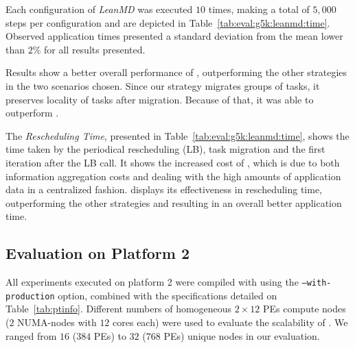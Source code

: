 


Each configuration of \textit{LeanMD} was executed $10$ times, making a total of $5,000$ steps per configuration and are depicted in Table~\ref{tab:eval:g5k:leanmd:time}.
Observed application times presented a standard deviation from the mean lower than $2\%$ for all results presented.

Results show a better overall performance of \packdrop, outperforming the other strategies in the two scenarios chosen.
Since our strategy migrates groups of tasks, it preserves locality of tasks after migration. 
Because of that, it was able to outperform \distributedlb.

The \textit{Rescheduling Time}, presented in Table~\ref{tab:eval:g5k:leanmd:time}, shows the time taken by the periodical rescheduling (LB), task migration and the first iteration after the LB call.
It shows the increased cost of , which is due to both information aggregation costs and dealing with the high amounts of application data in a centralized fashion.
\packdrop displays its effectiveness in rescheduling time, outperforming the other strategies and resulting in an overall better application time. 

\subsection{Evaluation on Platform 2} \label{sec:sdumont}

All experiments executed on platform 2 were compiled with \charm using the {\small\texttt{--with-production}} option, combined with the specifications detailed on Table~\ref{tab:ptinfo}.
Different numbers of homogeneous $2\times 12$ PEs compute nodes ($2$ NUMA-nodes with $12$ cores each) were used to evaluate the scalability of \packdrop.
We ranged from $16$ ($384$ PEs) to $32$ ($768$ PEs) unique nodes in our evaluation. 


